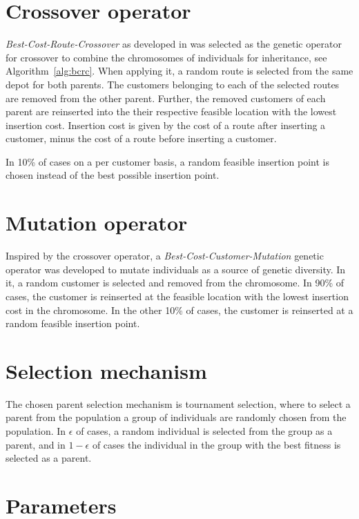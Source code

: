 \documentclass[paper=a4, fontsize=9pt]{scrartcl}
\begin{document}
\begin{multicols}{2}
\section*{Crossover operator}

\textit{Best-Cost-Route-Crossover} as developed in \cite{ombuki2006multi} was selected as the genetic operator for crossover to combine the chromosomes of individuals for inheritance, see Algorithm~\ref{alg:bcrc}. When applying it, a random route is selected from the same depot for both parents. The customers belonging to each of the selected routes are removed from the other parent. Further, the removed customers of each parent are reinserted into the their respective feasible location with the lowest insertion cost. Insertion cost is given by the cost of a route after inserting a customer, minus the cost of a route before inserting a customer.

In 10\% of cases on a per customer basis, a random feasible insertion point is chosen instead of the best possible insertion point.

\section*{Mutation operator}

Inspired by the crossover operator, a \textit{Best-Cost-Customer-Mutation} genetic operator was developed to mutate individuals as a source of genetic diversity. In it, a random customer is selected and removed from the chromosome. In 90\% of cases, the customer is reinserted at the feasible location with the lowest insertion cost in the chromosome. In the other 10\% of cases, the customer is reinserted at a random feasible insertion point.

\section*{Selection mechanism}

The chosen parent selection mechanism is tournament selection, where to select a parent from the population a group of individuals are randomly chosen from the population. In $\epsilon$ of cases, a random individual is selected from the group as a parent, and in $1 - \epsilon$ of cases the individual in the group with the best fitness is selected as a parent.

\section*{Parameters}


\end{multicols}
\end{document}
